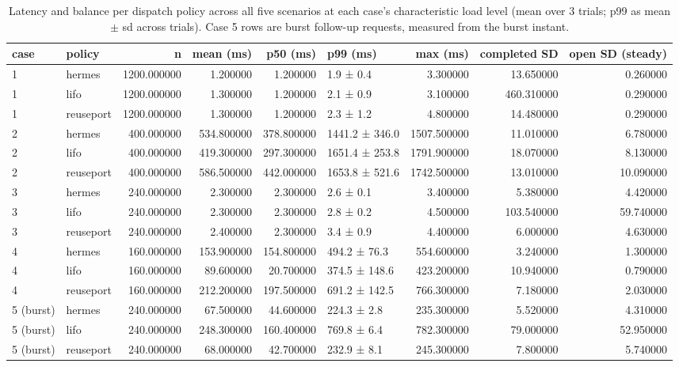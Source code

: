 \begin{table}
\caption{Latency and balance per dispatch policy across all five scenarios at each case's characteristic load level (mean over 3 trials; p99 as mean $\pm$ sd across trials). Case 5 rows are burst follow-up requests, measured from the burst instant.}
\label{tab:summary-stats}
\begin{tabular}{llrrrlrrr}
\toprule
case & policy & n & mean (ms) & p50 (ms) & p99 (ms) & max (ms) & completed SD & open SD (steady) \\
\midrule
1 & hermes & 1200.000000 & 1.200000 & 1.200000 & 1.9 ± 0.4 & 3.300000 & 13.650000 & 0.260000 \\
1 & lifo & 1200.000000 & 1.300000 & 1.200000 & 2.1 ± 0.9 & 3.100000 & 460.310000 & 0.290000 \\
1 & reuseport & 1200.000000 & 1.300000 & 1.200000 & 2.3 ± 1.2 & 4.800000 & 14.480000 & 0.290000 \\
2 & hermes & 400.000000 & 534.800000 & 378.800000 & 1441.2 ± 346.0 & 1507.500000 & 11.010000 & 6.780000 \\
2 & lifo & 400.000000 & 419.300000 & 297.300000 & 1651.4 ± 253.8 & 1791.900000 & 18.070000 & 8.130000 \\
2 & reuseport & 400.000000 & 586.500000 & 442.000000 & 1653.8 ± 521.6 & 1742.500000 & 13.010000 & 10.090000 \\
3 & hermes & 240.000000 & 2.300000 & 2.300000 & 2.6 ± 0.1 & 3.400000 & 5.380000 & 4.420000 \\
3 & lifo & 240.000000 & 2.300000 & 2.300000 & 2.8 ± 0.2 & 4.500000 & 103.540000 & 59.740000 \\
3 & reuseport & 240.000000 & 2.400000 & 2.300000 & 3.4 ± 0.9 & 4.400000 & 6.000000 & 4.630000 \\
4 & hermes & 160.000000 & 153.900000 & 154.800000 & 494.2 ± 76.3 & 554.600000 & 3.240000 & 1.300000 \\
4 & lifo & 160.000000 & 89.600000 & 20.700000 & 374.5 ± 148.6 & 423.200000 & 10.940000 & 0.790000 \\
4 & reuseport & 160.000000 & 212.200000 & 197.500000 & 691.2 ± 142.5 & 766.300000 & 7.180000 & 2.030000 \\
5 (burst) & hermes & 240.000000 & 67.500000 & 44.600000 & 224.3 ± 2.8 & 235.300000 & 5.520000 & 4.310000 \\
5 (burst) & lifo & 240.000000 & 248.300000 & 160.400000 & 769.8 ± 6.4 & 782.300000 & 79.000000 & 52.950000 \\
5 (burst) & reuseport & 240.000000 & 68.000000 & 42.700000 & 232.9 ± 8.1 & 245.300000 & 7.800000 & 5.740000 \\
\bottomrule
\end{tabular}
\end{table}
